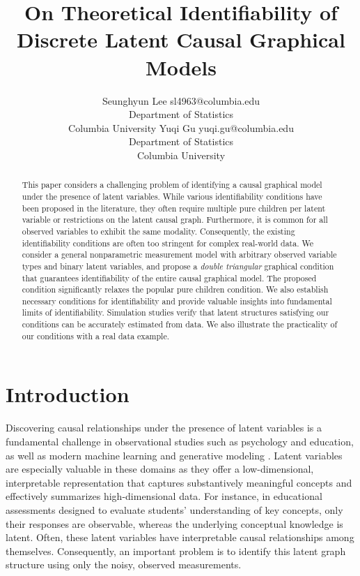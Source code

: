\documentclass[10pt]{article} %
\title{On Theoretical Identifiability of Discrete Latent Causal Graphical Models}
\author{\name Seunghyun Lee \email sl4963@columbia.edu \\
      \addr Department of Statistics \\
      Columbia University
      \AND
      \name Yuqi Gu \email yuqi.gu@columbia.edu \\
       \addr Department of Statistics \\
      Columbia University}
\begin{document}
\maketitle

\begin{abstract}
  This paper considers a challenging problem of identifying a causal graphical model under the presence of latent variables. While various identifiability conditions have been proposed in the literature, they often require multiple pure children per latent variable or restrictions on the latent causal graph. Furthermore, it is common for all observed variables to exhibit the same modality. %
    Consequently, the existing identifiability conditions are often too stringent for complex real-world data. We consider a general nonparametric measurement model with arbitrary observed variable types and binary latent variables, and propose a \emph{double triangular} graphical condition that guarantees identifiability of the entire causal graphical model. The proposed condition significantly relaxes the popular pure children condition. 
    We also establish necessary conditions for identifiability and provide valuable insights into fundamental limits of identifiability. Simulation studies verify that latent structures satisfying our conditions can be accurately estimated from data. {We also illustrate the practicality of our conditions with a real data example.}
\end{abstract}


\section{Introduction}
%

Discovering causal relationships under the presence of latent variables is a fundamental challenge in observational studies such as psychology and education, as well as modern machine learning and generative modeling \citep{bollen2002latent,pearl2014probabilistic}. Latent variables are especially valuable in these domains as they offer a low-dimensional, interpretable representation that captures substantively meaningful concepts and  effectively summarizes high-dimensional data.
%
For instance, in educational assessments designed to evaluate students' understanding of key concepts, only their responses are observable, whereas the underlying conceptual knowledge is latent. Often, these latent variables have interpretable causal relationships among themselves. Consequently, an important problem is to identify this latent graph structure using only the noisy, observed measurements.
\end{document}
